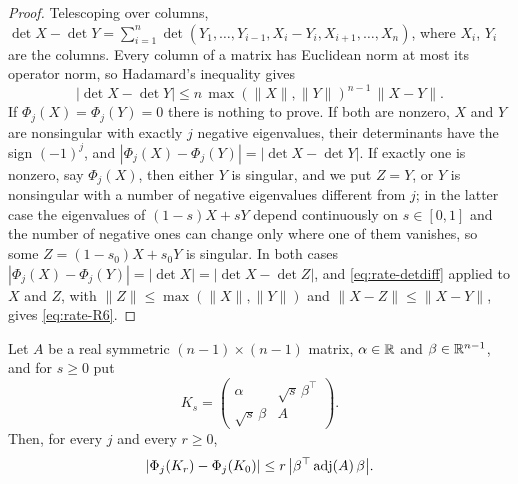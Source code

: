 \begin{proof}
Telescoping over columns, $\det X-\det Y=\sum_{i=1}^n\det(Y_1,\dots,Y_{i-1},X_i-Y_i,X_{i+1},\dots,X_n)$, where $X_i$, $Y_i$ are the columns. Every column of a matrix has Euclidean norm at most its operator norm, so Hadamard's inequality gives
\begin{equation}\label{eq:rate-detdiff}
|\det X-\det Y|\le n\,\max(\|X\|,\|Y\|)^{n-1}\,\|X-Y\| .
\end{equation}
If $\Phi_j(X)=\Phi_j(Y)=0$ there is nothing to prove. If both are nonzero, $X$ and $Y$ are nonsingular with exactly $j$ negative eigenvalues, their determinants have the sign $(-1)^j$, and $|\Phi_j(X)-\Phi_j(Y)|=|\det X-\det Y|$. If exactly one is nonzero, say $\Phi_j(X)$, then either $Y$ is singular, and we put $Z=Y$, or $Y$ is nonsingular with a number of negative eigenvalues different from $j$; in the latter case the eigenvalues of $(1-s)X+sY$ depend continuously on $s\in[0,1]$ and the number of negative ones can change only where one of them vanishes, so some $Z=(1-s_0)X+s_0Y$ is singular. In both cases $|\Phi_j(X)-\Phi_j(Y)|=|\det X|=|\det X-\det Z|$, and \eqref{eq:rate-detdiff} applied to $X$ and $Z$, with $\|Z\|\le\max(\|X\|,\|Y\|)$ and $\|X-Z\|\le\|X-Y\|$, gives \eqref{eq:rate-R6}.
\end{proof}

\begin{lemma}\label{lem:rate-offdiag}
Let $A$ be a real symmetric $(n-1)\times(n-1)$ matrix, $\alpha\in\mathbb R$ and $\beta\in\mathbb R^{n-1}$, and for $s\ge0$ put
\[
K_s=\begin{pmatrix}\alpha&\sqrt s\,\beta^{\top}\\ \sqrt s\,\beta&A\end{pmatrix}.
\]
Then, for every $j$ and every $r\ge0$,
\begin{equation}\label{eq:rate-R7}
|\Phi_j(K_r)-\Phi_j(K_0)|\le r\,\bigl|\beta^{\top}\operatorname{adj}(A)\,\beta\bigr| .
\end{equation}
\end{lemma}

